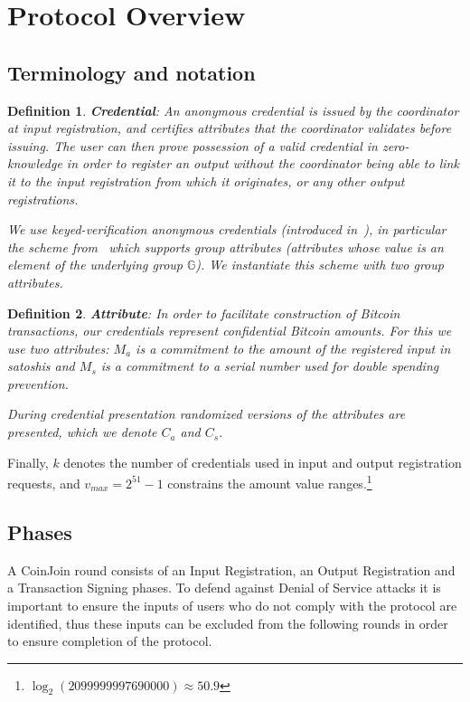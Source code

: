 \documentclass{article}
\newtheorem{definition}{Definition}[section]
\begin{document}
\section{Protocol Overview}

\subsection{Terminology and notation}

\begin{definition} \textbf{Credential}:
An anonymous credential is issued by the coordinator at input registration, and certifies attributes that the coordinator validates before issuing. The user can then prove possession of a valid credential in zero-knowledge in order to register an output without the coordinator being able to link it to the input registration from which it originates, or any other output registrations.

We use keyed-verification anonymous credentials (introduced in~\cite{chase2014algebraic}), in particular the scheme from~\cite{chase2019signal} which supports group attributes (attributes whose value is an element of the underlying group $\mathbb{G}$). We instantiate this scheme with two group attributes.
\end{definition}

\begin{definition}\textbf{Attribute}:
In order to facilitate construction of Bitcoin transactions, our credentials represent confidential Bitcoin amounts. For this we use two attributes: $M_a$ is a commitment to the amount of the registered input in satoshis and $M_s$ is a commitment to a serial number used for double spending prevention.

During credential presentation randomized versions of the attributes are presented, which we denote $C_a$ and $C_s$.
\end{definition}

Finally, $k$ denotes the number of credentials used in input and output registration requests, and $v_{\mathit{max}} = 2^{51}-1$ constrains the amount value ranges.\footnote{$\log_2(2099999997690000) \approx 50.9$}

\subsection{Phases}

A CoinJoin round consists of an Input Registration, an Output Registration and a Transaction Signing phases. To defend against Denial of Service attacks it is important to ensure the inputs of users who do not comply with the protocol are identified, thus these inputs can be excluded from the following rounds in order to ensure completion of the protocol.
\end{document}
